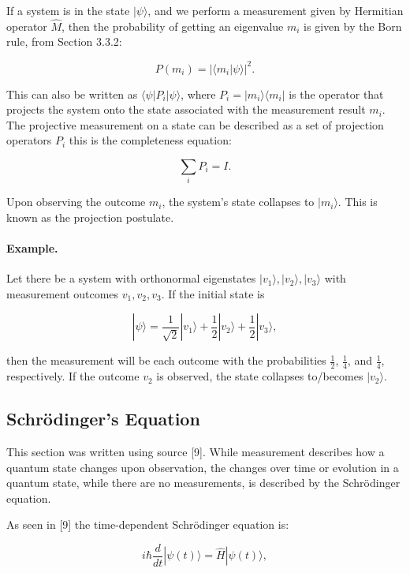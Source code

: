 \noindent If a system is in the state \( |\psi\rangle \), and we perform a measurement given by Hermitian operator \( \hat{M} \), then the probability of getting an eigenvalue \( m_i \) is given by the Born rule, from Section 3.3.2:

\[
P(m_i) = |\langle m_i | \psi \rangle|^2.
\]

\noindent This can also be written as \( \langle \psi | P_i | \psi \rangle \), where \( P_i = |m_i\rangle\langle m_i| \) is the operator that projects the system onto the state associated with the measurement result \( m_i \). The projective measurement on a state can be described as a set of projection operators $P_i$ this is the completeness equation:

\begin{equation}
 \sum_i P_i = I.
\end{equation}

\noindent Upon observing the outcome \( m_i \), the system's state collapses to \( |m_i\rangle \). This is known as the projection postulate.

\paragraph{Example.}
Let there be a system with orthonormal eigenstates \( |v_1\rangle, |v_2\rangle, |v_3\rangle \) with measurement outcomes \( v_1, v_2, v_3 \). If the initial state is

\[
|\psi\rangle = \frac{1}{\sqrt{2}} |v_1\rangle + \frac{1}{2} |v_2\rangle + \frac{1}{2} |v_3\rangle,
\]

\noindent then the measurement will be each outcome with the probabilities \( \frac{1}{2} \), \( \frac{1}{4} \), and \( \frac{1}{4} \), respectively. If the outcome  \( v_2\) is observed, the state collapses to/becomes \( |v_2\rangle \).


\subsection{Schrödinger’s Equation}
This section was written using source [9].
\noindent While measurement describes how a quantum state changes upon observation, the changes over time or evolution in a quantum state, while there are no measurements, is described by the Schrödinger equation.

\noindent As seen in [9] the time-dependent Schrödinger equation is:

\begin{equation}
i\hbar \frac{d}{dt}|\psi(t)\rangle = \hat{H}|\psi(t)\rangle,
\end{equation}

